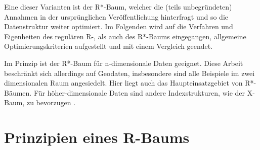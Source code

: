 \documentclass[runningheads,a4paper]{llncs}
\begin{document}
	Eine dieser Varianten ist der R*-Baum, welcher die (teils unbegründeten) Annahmen in der ursprünglichen Veröffentlichung hinterfragt und so die Datenstruktur weiter optimiert. Im Folgenden wird auf die Verfahren und Eigenheiten des regulären R-, als auch des R*-Baums eingegangen, allgemeine Optimierungskriterien aufgestellt und mit einem Vergleich geendet.

	Im Prinzip ist der R*-Baum für n-dimensionale Daten geeignet. Diese Arbeit beschränkt sich allerdings auf Geodaten, insbesondere sind alle Beispiele im zwei dimensionalen Raum angesiedelt. Hier liegt auch das Haupteinsatzgebiet von R*-Bäumen. Für höher-dimensionale Daten sind andere Indexstrukturen, wie der X-Baum, zu bevorzugen \citep[vgl.][28-29]{Kriegel:1996}.


\section{Prinzipien eines R-Baums} %
\label{sec:prinzipien_eines_r_baums}
\end{document}
